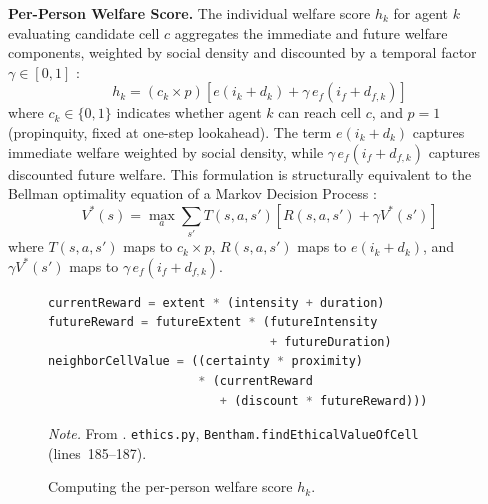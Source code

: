 \documentclass{icsthesis}
\begin{document}
\begin{mainmatter}
\textbf{Per-Person Welfare Score.}
The individual welfare score $h_k$ for agent $k$ evaluating candidate cell $c$ aggregates the immediate and future welfare components, weighted by social density and discounted by a temporal factor $\gamma \in [0, 1]$ \citep{KremerHerman2024}:
\begin{equation}
	h_k = (c_k \times p) \left[ e(i_k + d_k) + \gamma\, e_f(i_f + d_{f,k}) \right]
\end{equation}
where $c_k \in \{0,1\}$ indicates whether agent $k$ can reach cell $c$, and $p = 1$ (propinquity, fixed at one-step lookahead). The term $e(i_k + d_k)$ captures immediate welfare weighted by social density, while $\gamma\, e_f(i_f + d_{f,k})$ captures discounted future welfare. This formulation is structurally equivalent to the Bellman optimality equation of a Markov Decision Process \citep{KremerHerman2024}:
\begin{equation}
	V^*(s) = \max_a \sum_{s'} T(s, a, s')\left[ R(s, a, s') + \gamma V^*(s') \right]
\end{equation}
where $T(s, a, s')$ maps to $c_k \times p$, $R(s, a, s')$ maps to $e(i_k + d_k)$, and $\gamma V^*(s')$ maps to $\gamma\, e_f(i_f + d_{f,k})$.
\begin{figure}[H]
\caption{Computing the per-person welfare score \(h_k\).}
\begin{lstlisting}[language=Python, firstnumber=185]
currentReward = extent * (intensity + duration)
futureReward = futureExtent * (futureIntensity
                               + futureDuration)
neighborCellValue = ((certainty * proximity)
                     * (currentReward
                        + (discount * futureReward)))
\end{lstlisting}
{\footnotesize\noindent\textit{Note.} From \citet{KremerHerman2024}. \texttt{ethics.py}, \texttt{Bentham.findEthicalValueOfCell} (lines~185--187).}
\end{figure}


\end{mainmatter}
\end{document}
